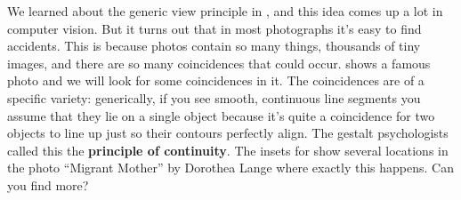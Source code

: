 We learned about the generic view principle in \chap{\ref{chapter:simplesystem}}, and this idea comes up a lot in computer vision. But it turns out that in most photographs it's easy to find accidents. This is because photos contain so many things, thousands of tiny images, and there are so many coincidences that could occur. \Fig{\ref{fig:visionscience:migrant_mother}} shows a famous photo and we will look for some coincidences in it. The coincidences are of a specific variety: generically, if you see smooth, continuous line segments you assume that they lie on a single object because it's quite a coincidence for two objects to line up just so their contours perfectly align. The gestalt psychologists called this the {\bf principle of continuity}. The insets  for \fig{\ref{fig:visionscience:migrant_mother}} show several locations in the photo ``Migrant Mother'' by Dorothea Lange where exactly this happens. Can you find more?

